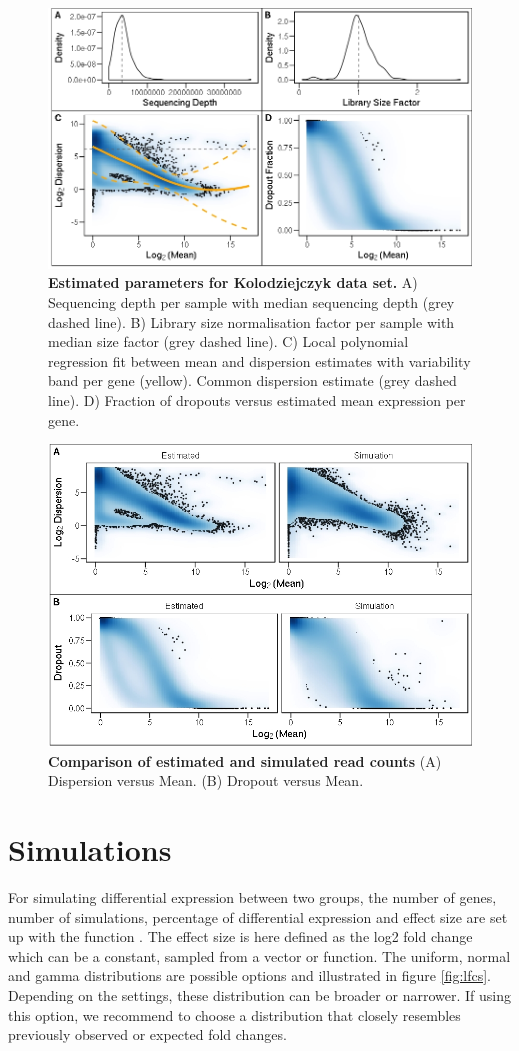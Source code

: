 \documentclass{article}\usepackage[]{graphicx}\usepackage[usenames,dvipsnames]{color}
\begin{document}
\begin{figure}[h]
\centering
\includegraphics[width=0.75\linewidth]{NBparams.jpeg}
\caption{\textbf{Estimated parameters for Kolodziejczyk data set.} A) Sequencing depth per sample with median sequencing depth (grey dashed line). B) Library size normalisation factor per sample with median size factor (grey dashed line). C) Local polynomial regression fit between mean and dispersion estimates with variability band per gene (yellow). Common dispersion estimate (grey dashed line). D) Fraction of dropouts versus estimated mean expression per gene.}
\label{fig:NBparams}
\end{figure}

\begin{figure}[h]
\centering
\includegraphics[width=0.7\linewidth]{simeval.jpeg}
\caption{\textbf{Comparison of estimated and simulated read counts} (A) Dispersion versus Mean. (B) Dropout versus Mean.}
\label{fig:simeval}
\end{figure}

\section{Simulations}
For simulating differential expression between two groups, the number of genes, number of simulations, percentage of differential expression and effect size are set up with the function . The effect size is here defined as the log2 fold change which can be a constant, sampled from a vector or function. The uniform, normal and gamma distributions are possible options and illustrated in figure \ref{fig:lfcs}. Depending on the settings, these distribution can be broader or narrower. If using this option, we recommend to choose a distribution that closely resembles previously observed or expected fold changes.
\end{document}
